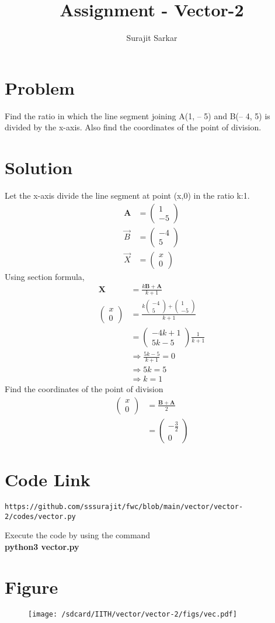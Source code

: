 \documentclass[journal,12pt,twocolumn]{IEEEtran}
\title{\mytitle}
\title{
Assignment - Vector-2
}
\author{Surajit Sarkar}
\newcommand{\myvec}[1]{\ensuremath{\begin{pmatrix}#1\end{pmatrix}}}
\let\vec\mathbf
\begin{document}
\maketitle
\tableofcontents
\bigskip
\section{\textbf{Problem}}
Find the ratio in which the line segment joining A(1, – 5) and B(– 4, 5) is divided by the
x-axis. Also find the coordinates of the point of division.
\section{\textbf{Solution}}
Let the x-axis divide the line segment at point (x,0) in the ratio k:1.
\begin{align}
\vec{A}&=\myvec{1 \\ -5} \\ 
\Vec{B}&=\myvec{-4 \\ 5} \\ 
\Vec{X}&=\myvec{x\\0}
\end{align}
Using section formula,
\begin{align}
\vec{X}&=\frac{k\vec{B}+\vec{A}}{k+1}\\
\myvec{x\\0}&=\frac{k\myvec{-4\\5}+\myvec{1\\-5}}{k+1}\\
&=\myvec{-4k+1\\5k-5}\frac{1}{k+1}\\
&\Rightarrow \frac{5k-5}{k+1}=0\\
&\Rightarrow 5k=5\\
&\Rightarrow k=1
\end{align}
Find the coordinates of the point of division
\begin{align}
    \myvec{x\\0}&=\frac{\vec{B}+\vec{A}}{2}\\
    &=\myvec{-\frac{3}{2}\\0}
\end{align}
\section{\textbf{Code Link}}
\begin{lstlisting}
https://github.com/sssurajit/fwc/blob/main/vector/vector-2/codes/vector.py
\end{lstlisting}
Execute the code by using the command\\
\textbf{python3 vector.py}
\section{\textbf{Figure}}
\begin{figure}[!h]
\centering
\texttt{[image: /sdcard/IITH/vector/vector-2/figs/vec.pdf]}
\caption{}
\label{fig:vec}
\end{figure}
\end{document}

